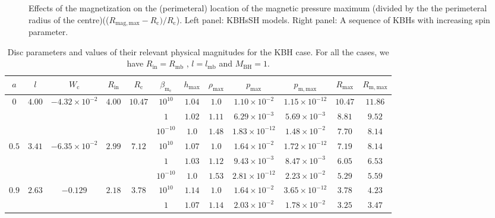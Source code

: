 \documentclass[twocolumn,aps,showpacs,showkeys,prd,superscriptaddress,byrevtex, amsmath]{revtex4-1}
\begin{document}
\begin{figure}
\hspace{0.5cm}
\caption{Effects of the magnetization on the (perimeteral) location of the magnetic pressure maximum (divided by the the perimeteral radius of the centre)(($R_{\mathrm{mag}, \mathrm{max}} - R_{\mathrm{c}})/ R_{\mathrm{c}}$). Left panel: KBHsSH models. Right panel: A sequence of KBHs with increasing spin parameter. }
\label{comparison_HBH_Kerr_r_m_max}
\end{figure}


\begin{table}[t]
\caption{Disc parameters and values of their relevant physical magnitudes for the KBH case. For all the cases, we have $R_{\mathrm{in}} = R_{\mathrm{mb}}$ , $l = l_{\mathrm{mb}}$ and $M_{\mathrm{BH}} = 1$.}        
\label{KBH_disk_parameters}      
\centering          
\begin{tabular}{c c c c c  c c c c c c c}
\hline\hline       
 $a$ & $l$ & $W_{\mathrm{c}}$ & $R_{\mathrm{in}}$ & $R_{\mathrm{c}}$ &  $\beta_{\mathrm{m_{\mathrm{c}}}}$ & $h_{\mathrm{max}}$ & $\rho_{\mathrm{max}}$ & $p_{\mathrm{max}}$ & $p_{\mathrm{m, max}}$ & $R_{\mathrm{max}}$ & $R_{\mathrm{m, max}}$\\ 
\hline           
$0$ & $4.00$ & $-4.32 \times 10^{-2}$ & $4.00$ & $10.47$ & $10^{10}$ & $1.04$ & $1.0$ & $1.10 \times 10^{-2}$ & $1.15 \times 10^{-12}$ & $10.47$ & $11.86$\\ 
 \hline 
 &  &  &  &  & $1$ & $1.02$ & $1.11$ & $6.29 \times 10^{-3}$ & $5.69 \times 10^{-3}$ & $8.81$ & $9.52$\\ 
 \hline 
 &  &  &  &  & $10^{-10}$ & $1.0$ & $1.48$ & $1.83 \times 10^{-12}$ & $1.48 \times 10^{-2}$ & $7.70$ & $8.14$\\ 
 \hline 
 $0.5$ & $3.41$ & $-6.35 \times 10^{-2}$ & $2.99$ & $7.12$ & $10^{10}$ & $1.07$ & $1.0$ & $1.64 \times 10^{-2}$ & $1.72 \times 10^{-12}$ & $7.19$ & $8.14$\\ 
 \hline 
 &  &  &  &  & $1$ & $1.03$ & $1.12$ & $9.43 \times 10^{-3}$ & $8.47 \times 10^{-3}$ & $6.05$ & $6.53$ \\ 
 \hline 
 &  &  &  &  & $10^{-10}$ & $1.0$ & $1.53$ & $2.81 \times 10^{-12}$ & $2.23 \times 10^{-2}$ & $5.29$ & $5.59$\\ 
\hline  
$0.9$ & $2.63$ & $-0.129$ & $2.18$ & $3.78$ & $10^{10}$ & $1.14$ & $1.0$ & $1.64 \times 10^{-2}$ & $3.65 \times 10^{-12}$ & $3.78$ & $4.23$\\ 
 \hline 
 &  &  &  &  & $1$ & $1.07$ & $1.14$ & $2.03 \times 10^{-2}$ & $1.78 \times 10^{-2}$ & $3.25$ & $3.47$\\ 

\end{tabular}
\end{table}
\end{document}
